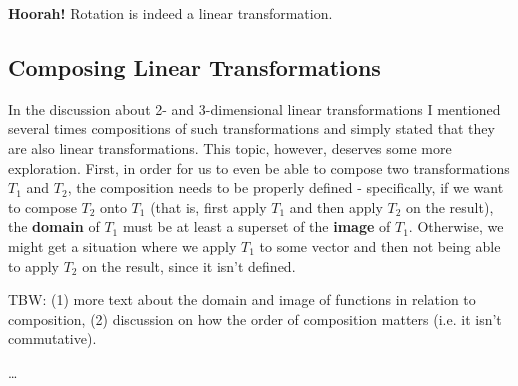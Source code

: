 \textcolor{xred}{\textbf{Hoorah!}} Rotation is indeed a linear transformation.


\subsection{Composing Linear Transformations}
In the discussion about 2- and 3-dimensional linear transformations I mentioned several times compositions of such transformations and simply stated that they are also linear transformations. This topic, however, deserves some more exploration. First, in order for us to even be able to compose two transformations $T_{1}$ and $T_{2}$, the composition needs to be properly defined - specifically, if we want to compose $T_{2}$ onto $T_{1}$ (that is, first apply $T_{1}$ and then apply $T_{2}$ on the result), the \textbf{domain} of $T_{1}$ must be at least a superset of the \textbf{image} of $T_{1}$. Otherwise, we might get a situation where we apply $T_{1}$ to some vector and then not being able to apply $T_{2}$ on the result, since it isn't defined.

TBW: (1) more text about the domain and image of functions in relation to composition, (2) discussion on how the order of composition matters (i.e. it isn't commutative).

\dots

